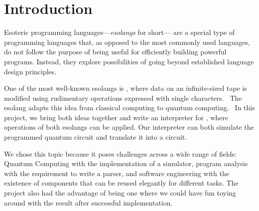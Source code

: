 \section{Introduction}
\label{sec:intro}

Esoteric programming languages---\emph{esolangs} for short--- are a special type of programming languages that, as opposed to the most commonly used languages, do not follow the purpose of being useful for efficiently building powerful programs. Instead, they explore possibilities of going beyond established language design principles.~\cite{temkin-2017}

One of the most well-known esolangs is \bfck{}, where data on an infinite-sized tape is modified using rudimentary operations expressed with single characters.~\cite{temkin-2017,brainfuck-esolangs} The esolang \qbfck{} adapts this idea from classical computing to quantum computing.~\cite{brainfuq-esolangs} In this project, we bring both ideas together and write an interpreter for \bfq{}, where operations of both esolangs can be applied. Our interpreter can both simulate the programmed quantum circuit and translate it into a \qiskit{} circuit.

We chose this topic because it poses challenges across a wide range of fields: Quantum Computing with the implementation of a simulator, program analysis with the requirement to write a parser, and software engineering with the existence of components that can be reused elegantly for different tasks. The project also had the advantage of being one where we could have fun toying around with the result after successful implementation.
